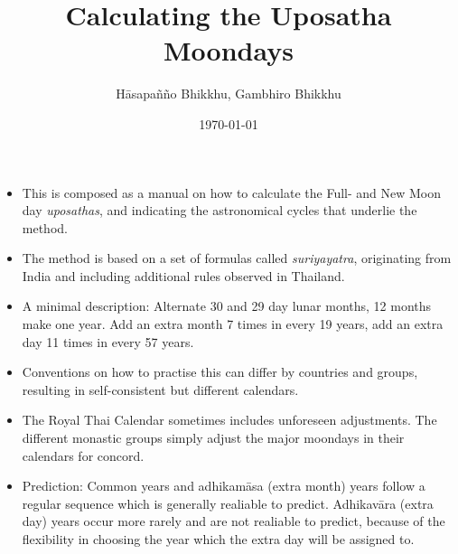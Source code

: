 \documentclass[11pt,oneside]{memoir-article}
\author{Hāsapañño Bhikkhu, Gambhiro Bhikkhu}
\date{\today}
\title{Calculating the Uposatha Moondays}
\begin{document}
\maketitle
\begin{tldr}
\begin{itemize}
\item This is composed as a manual on how to calculate the Full- and New Moon day
\emph{uposathas}, and indicating the astronomical cycles that underlie the method.
\item The method is based on a set of formulas called \emph{suriyayatra}, originating
from India and including additional rules observed in Thailand.
\item A minimal description: Alternate 30 and 29 day lunar months, 12 months make
one year. Add an extra month 7 times in every 19 years, add an extra day 11
times in every 57 years.
\item Conventions on how to practise this can differ by countries and
groups, resulting in self-consistent but different calendars.
\item The Royal Thai Calendar sometimes includes unforeseen adjustments. The
different monastic groups simply adjust the major moondays in their calendars
for concord.
\item Prediction: Common years and adhikamāsa (extra month) years follow a regular
sequence which is generally realiable to predict. Adhikavāra (extra day) years
occur more rarely and are not realiable to predict, because of the flexibility
in choosing the year which the extra day will be assigned to.
\end{itemize}
\end{tldr}
\end{document}
